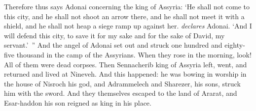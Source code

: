 \begin{biblechapter}
\verse Therefore thus says Adonai concerning the king of Assyria:
\verse ‘He shall not come to this city, 
and he shall not shoot an arrow there, 
and he shall not meet it with a shield, 
and he shall not heap a siege ramp up against her. \textit{declares} Adonai.
\verse ‘And I will defend this city, to save it for my sake and for the sake of David, my servant.’ ”
 And the angel of Adonai set out and struck one hundred and eighty-five thousand in the camp of the Assyrians. When they rose in the morning, look! All of them were dead corpses.
\verse Then Sennacherib king of Assyria left, went, and returned and lived at Nineveh.
\verse And this happened: he was bowing in worship in the house of Nisroch his god, and Adrammelech and Sharezer, his sons, struck him with the sword. And they themselves escaped to the land of Ararat, and Esar-haddon his son reigned as king in his place.
\end{biblechapter}

